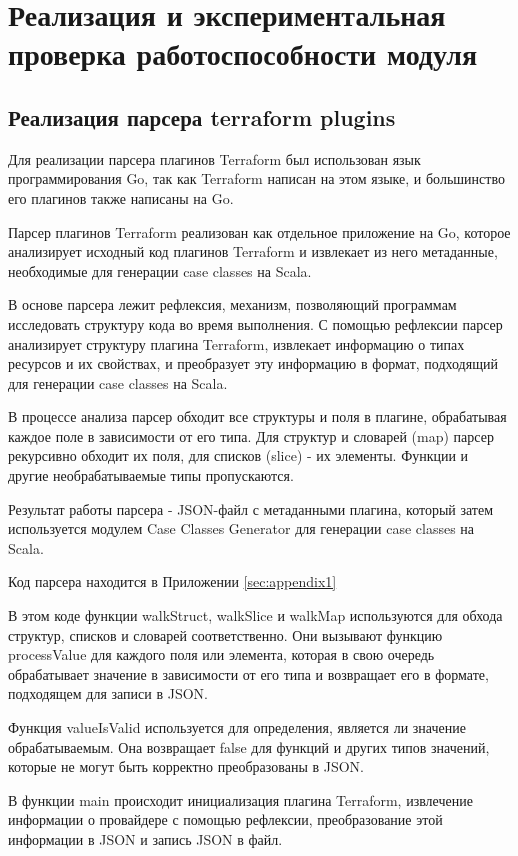 \chapter{Реализация и экспериментальная проверка работоспособности
модуля}

\section{Реализация парсера terraform plugins}

Для реализации парсера плагинов Terraform был использован язык программирования
Go, так как Terraform написан на этом языке, и большинство его плагинов также
написаны на Go.

Парсер плагинов Terraform реализован как отдельное приложение на Go, которое
анализирует исходный код плагинов Terraform и извлекает из него метаданные,
необходимые для генерации case classes на Scala.

В основе парсера лежит рефлексия, механизм, позволяющий программам исследовать
структуру кода во время выполнения. С помощью рефлексии парсер анализирует
структуру плагина Terraform, извлекает информацию о типах ресурсов и их
свойствах, и преобразует эту информацию в формат, подходящий для генерации case
classes на Scala.

В процессе анализа парсер обходит все структуры и поля в плагине, обрабатывая
каждое поле в зависимости от его типа. Для структур и словарей (map) парсер
рекурсивно обходит их поля, для списков (slice) - их элементы. Функции и другие
необрабатываемые типы пропускаются.

Результат работы парсера - JSON-файл с метаданными плагина, который затем
используется модулем Case Classes Generator для генерации case classes на Scala.

Код парсера находится в Приложении \ref{sec:appendix1}

В этом коде функции walkStruct, walkSlice и walkMap используются для обхода
структур, списков и словарей соответственно. Они вызывают функцию processValue
для каждого поля или элемента, которая в свою очередь обрабатывает значение в
зависимости от его типа и возвращает его в формате, подходящем для записи в
JSON.

Функция valueIsValid используется для определения, является ли значение
обрабатываемым. Она возвращает false для функций и других типов значений,
которые не могут быть корректно преобразованы в JSON.

В функции main происходит инициализация плагина Terraform, извлечение информации
о провайдере с помощью рефлексии, преобразование этой информации в JSON и запись
JSON в файл.

